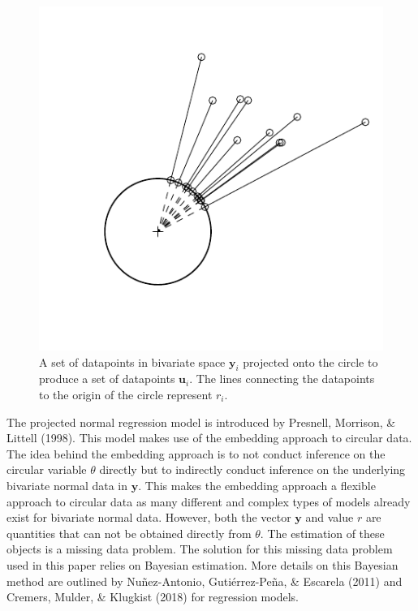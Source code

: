 \documentclass[11pt,]{article}
\begin{document}
\begin{figure}
        \centering

\includegraphics[width=\textwidth]{plotprojecting.pdf}
       
        \caption{A set of datapoints in bivariate space $\boldsymbol{y}_i$ projected onto the circle to produce         a set of datapoints $\boldsymbol{u}_i$. The lines connecting the datapoints to the origin of the circle         represent $r_i$.}
        
        \label{projectingplot}
        
\end{figure}

The projected normal regression model is introduced by Presnell,
Morrison, \& Littell (1998). This model makes use of the embedding
approach to circular data. The idea behind the embedding approach is to
not conduct inference on the circular variable \(\theta\) directly but
to indirectly conduct inference on the underlying bivariate normal data
in \(\boldsymbol{y}\). This makes the embedding approach a flexible
approach to circular data as many different and complex types of models
already exist for bivariate normal data. However, both the vector
\(\boldsymbol{y}\) and value \(r\) are quantities that can not be
obtained directly from \(\theta\). The estimation of these objects is a
missing data problem. The solution for this missing data problem used in
this paper relies on Bayesian estimation. More details on this Bayesian
method are outlined by Nuñez-Antonio, Gutiérrez-Peña, \& Escarela (2011)
and Cremers, Mulder, \& Klugkist (2018) for regression models.
\end{document}
